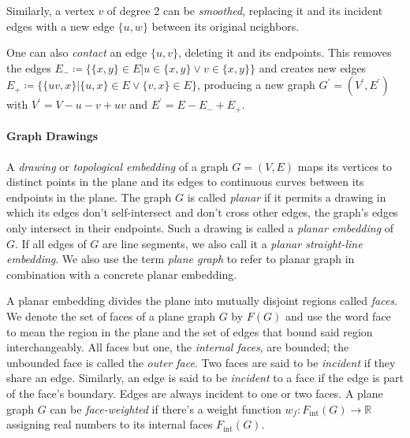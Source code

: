\begin{definition}
Similarly, a vertex $v$ of degree 2 can be \emph{smoothed}, replacing it and its incident edges with a new edge $\{u,w\}$ between its original neighbors.
\end{definition}

\begin{definition}
One can also \emph{contact} an edge $\{u,v\}$, deleting it and  its endpoints.
This removes the edges $E_- \coloneqq \{ \{x,y\} \in E \vert u \in \{x,y\} \lor v \in \{x,y\} \}$ and creates new edges $E_+ \coloneqq \{ \{uv,x\} \vert \{u,x\} \in E \lor \{v,x\} \in E \}$, producing a new graph $G^\prime = (V^\prime, E^\prime)$ with $V^\prime = V - u - v + uv$ and $E^\prime = E - E_- + E_+$.
\end{definition}



\paragraph{Graph Drawings}

\begin{definition}
A \emph{drawing} or \emph{topological embedding} of a graph $G = (V, E)$ maps its vertices to distinct points in the plane and its edges to continuous curves between its endpoints in the plane.
The graph $G$ is called \emph{planar} if it permits a drawing in which its edges don't self-intersect and don't cross other edges, \ie{} the graph's edges only intersect in their endpoints.
Such a drawing is called a \emph{planar embedding} of $G$.
If all edges of $G$ are line segments, we also call it a \emph{planar straight-line embedding}.
We also use the term \emph{plane graph} to refer to planar graph in combination with a concrete planar embedding.
\end{definition}

\begin{definition}
A planar embedding divides the plane into mutually disjoint regions called \emph{faces}.
We denote the set of faces of a plane graph $G$ by $F(G)$ and use the word face to mean the region in the plane and the set of edges that bound said region interchangeably.
All faces but one, the \emph{internal faces}, are bounded; the unbounded face is called the \emph{outer face}.
Two faces are said to be \emph{incident} if they share an edge.
Similarly, an edge is said to be \emph{incident} to a face if the edge is part of the face's boundary.
Edges are always incident to one or two faces.
A plane graph $G$ can be \emph{face-weighted} if there's a weight function $w_f \colon F_\text{int}(G) \to \mathbb{R}$ assigning real numbers to its internal faces $F_\text{int}(G)$.
\end{definition}

